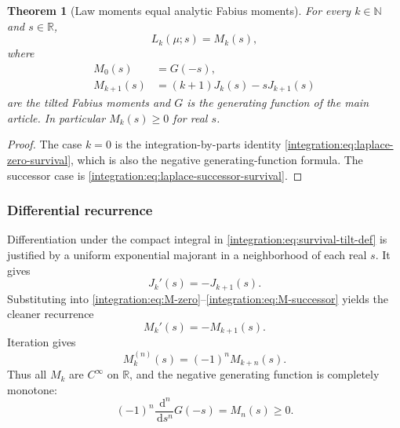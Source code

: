 \documentclass[11pt,oneside]{article}
\newtheorem{theorem}{Theorem}[section]
\theoremstyle{definition}
\theoremstyle{remark}
\newcommand{\R}{\mathbb R}
\newcommand{\N}{\mathbb N}
\newcommand{\dd}{\,\mathrm d}
\begin{document}
\begin{theorem}[Law moments equal analytic Fabius moments]
\label{integration:thm:law-moments-identification}
For every $k\in\N$ and $s\in\R$,
\begin{equation}
 L_k(\mu;s)=M_k(s),
 \label{integration:eq:law-M-identification}
\end{equation}
where
\begin{align}
 M_0(s)&=G(-s),                                            \label{integration:eq:M-zero}\\
 M_{k+1}(s)&=(k+1)J_k(s)-sJ_{k+1}(s)                      \label{integration:eq:M-successor}
\end{align}
are the tilted Fabius moments and $G$ is the generating function of the main article.
In particular $M_k(s)\ge0$ for real $s$.
\end{theorem}

\begin{proof}
The case $k=0$ is the integration-by-parts identity
\eqref{integration:eq:laplace-zero-survival}, which is also the negative generating-function formula.
The successor case is \eqref{integration:eq:laplace-successor-survival}.
\end{proof}

\subsubsection{Differential recurrence}

Differentiation under the compact integral in \eqref{integration:eq:survival-tilt-def} is justified by a
uniform exponential majorant in a neighborhood of each real $s$.  It gives
\begin{equation}
 J_k'(s)=-J_{k+1}(s).
 \label{integration:eq:J-differential-recurrence}
\end{equation}
Substituting into \eqref{integration:eq:M-zero}--\eqref{integration:eq:M-successor} yields the cleaner recurrence
\begin{equation}
 M_k'(s)=-M_{k+1}(s).
 \label{integration:eq:M-differential-recurrence}
\end{equation}
Iteration gives
\begin{equation}
 M_k^{(n)}(s)=(-1)^nM_{k+n}(s).
 \label{integration:eq:M-iterated-derivative}
\end{equation}
Thus all $M_k$ are $C^\infty$ on $\R$, and the negative generating function is completely
monotone:
\begin{equation}
 (-1)^n\frac{\dd^n}{\dd s^n}G(-s)=M_n(s)\ge0.
 \label{integration:eq:complete-monotonicity}
\end{equation}
\end{document}
